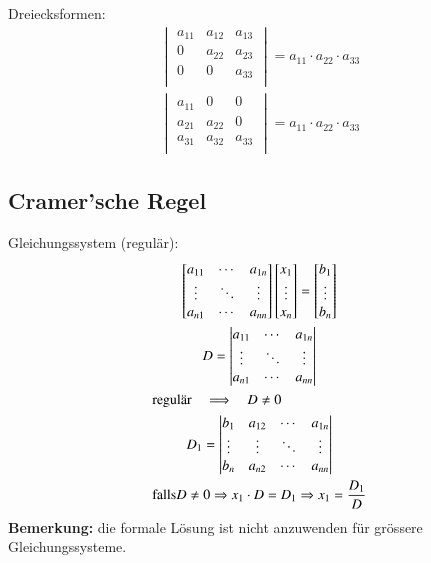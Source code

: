 Dreiecksformen:
\begin{gather}
  \begin{vmatrix}
    a_{11} & a_{12} & a_{13} \\
    0 & a_{22} & a_{23} \\
    0 & 0 & a_{33} \\
  \end{vmatrix} = a_{11}\cdot a_{22}\cdot a_{33} \\
  \begin{vmatrix}
    a_{11} & 0 & 0 \\
    a_{21} & a_{22} & 0 \\
    a_{31} & a_{32} & a_{33} \\
  \end{vmatrix} = a_{11}\cdot a_{22}\cdot a_{33}
\end{gather}


\subsection{Cramer'sche Regel}
Gleichungssystem (regul\"ar):
\begin{gather}
  \begin{bmatrix}
	a_{11} & \cdots & a_{1n} \\
	\vdots & \ddots & \vdots \\
	a_{n1} & \cdots & a_{nn}
  \end{bmatrix}
  \begin{bmatrix}
	x_1 \\
	\vdots \\
	x_n
  \end{bmatrix}
  =
  \begin{bmatrix}
	b_1 \\
	\vdots \\
	b_n
  \end{bmatrix} \\
  D = \begin{vmatrix}
	a_{11} & \cdots & a_{1n} \\
	\vdots & \ddots & \vdots \\
	a_{n1} & \cdots & a_{nn}
  \end{vmatrix} \\
  \intertext{regul\"ar $\quad \Longrightarrow \quad D \neq 0$}
  D_1 = \begin{vmatrix}
	b_1 & a_{12} & \cdots & a_{1n} \\
	\vdots & \vdots & \ddots & \vdots \\
	b_n & a_{n2} & \cdots & a_{nn}
  \end{vmatrix} \\
  \text{falls} D\neq 0 \Rightarrow x_1\cdot D=D_1 \Rightarrow x_1 =\frac{D_1}{D}
\end{gather}
\textbf{Bemerkung:} die formale L\"osung ist nicht anzuwenden f\"ur gr\"ossere
Gleichungssysteme.


